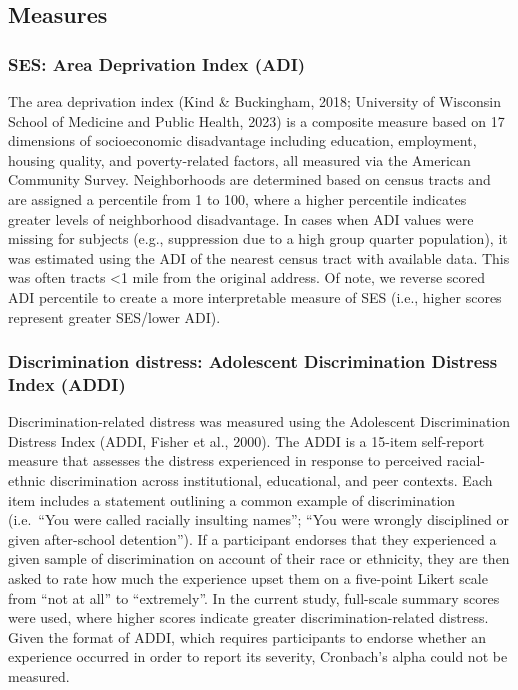 \documentclass[
  man]{apa7}
\begin{document}
\hypertarget{measures}{%
\subsection{Measures}\label{measures}}

\hypertarget{ses-area-deprivation-index-adi}{%
\subsubsection{SES: Area Deprivation Index (ADI)}\label{ses-area-deprivation-index-adi}}

The area deprivation index (Kind \& Buckingham, 2018; University of Wisconsin School of Medicine and Public Health, 2023) is a composite measure based on 17 dimensions of socioeconomic disadvantage including education, employment, housing quality, and poverty-related factors, all measured via the American Community Survey. Neighborhoods are determined based on census tracts and are assigned a percentile from 1 to 100, where a higher percentile indicates greater levels of neighborhood disadvantage. In cases when ADI values were missing for subjects (e.g., suppression due to a high group quarter population), it was estimated using the ADI of the nearest census tract with available data. This was often tracts \textless1 mile from the original address. Of note, we reverse scored ADI percentile to create a more interpretable measure of SES (i.e., higher scores represent greater SES/lower ADI).

\hypertarget{discrimination-distress-adolescent-discrimination-distress-index-addi}{%
\subsubsection{Discrimination distress: Adolescent Discrimination Distress Index (ADDI)}\label{discrimination-distress-adolescent-discrimination-distress-index-addi}}

Discrimination-related distress was measured using the Adolescent Discrimination Distress Index (ADDI, Fisher et al., 2000). The ADDI is a 15-item self-report measure that assesses the distress experienced in response to perceived racial-ethnic discrimination across institutional, educational, and peer contexts. Each item includes a statement outlining a common example of discrimination (i.e.~``You were called racially insulting names''; ``You were wrongly disciplined or given after-school detention''). If a participant endorses that they experienced a given sample of discrimination on account of their race or ethnicity, they are then asked to rate how much the experience upset them on a five-point Likert scale from ``not at all'' to ``extremely''. In the current study, full-scale summary scores were used, where higher scores indicate greater discrimination-related distress. Given the format of ADDI, which requires participants to endorse whether an experience occurred in order to report its severity, Cronbach's alpha could not be measured.
\end{document}
